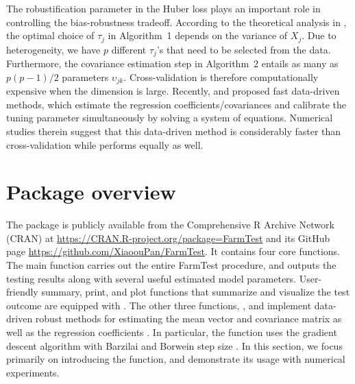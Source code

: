 The robustification parameter in the Huber loss plays an important role in controlling the bias-robustness tradeoff. According to the theoretical analysis in \cite{ZBFL2017}, the optimal choice of $\tau_j$ in Algorithm~1 depends on the variance of $X_j$.  Due to heterogeneity, we have $p$ different $\tau_j$'s that need to be selected from the data. Furthermore, the covariance estimation step in Algorithm~2 entails as many as $p(p-1)/2$ parameters $\upsilon_{jk}$. Cross-validation is therefore computationally expensive when the dimension is large.
Recently, \cite{KMRSZ2019} and \cite{WZZZ2020} proposed fast data-driven methods, which estimate the regression coefficients/covariances and calibrate the tuning parameter simultaneously by solving a system of equations. Numerical studies therein suggest that this data-driven method is considerably faster than cross-validation while performs equally as well. 





\section[Package overview]{Package overview}
\label{sec:overview}

The  package is publicly available from the Comprehensive R Archive Network (CRAN) at
\url{https://CRAN.R-project.org/package=FarmTest} and its GitHub page \url{https://github.com/XiaoouPan/FarmTest}.
It contains four core functions. The main function  carries out the entire FarmTest procedure, and outputs the testing results along with several useful estimated model parameters. User-friendly summary, print, and plot functions that summarize and visualize the test outcome are equipped with .
The other three functions, ,  and  implement data-driven robust methods for estimating the mean vector and covariance matrix \citep{KMRSZ2019} as well as the regression coefficients \citep{WZZZ2020}.
In particular, the  function uses the gradient descent algorithm with Barzilai and Borwein step size \citep{BB1988}.
In this section, we focus primarily on introducing the  function, and demonstrate its usage with numerical experiments.





